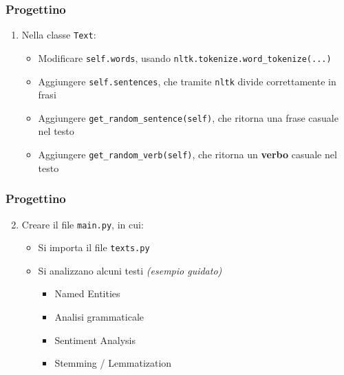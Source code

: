 \begin{exerciseframe}
    \frametitle{Progettino}

    \begin{enumerate}
        \item Nella classe \texttt{Text}:
        \begin{itemize}
            \item Modificare \texttt{self.words}, usando \texttt{nltk.tokenize.word\_tokenize(...)}
            \pause
            \item Aggiungere \texttt{self.sentences}, che tramite \texttt{nltk} divide correttamente in frasi
            \item Aggiungere \texttt{get\_random\_sentence(self)}, che ritorna una frase casuale nel testo
            \item Aggiungere \texttt{get\_random\_verb(self)}, che ritorna un \textbf{verbo} casuale nel testo
        \end{itemize}
    \end{enumerate}
\end{exerciseframe}

\begin{exerciseframe}
    \frametitle{Progettino}

    \begin{enumerate}
        \setcounter{enumi}{1}
        \item Creare il file \texttt{main.py}, in cui:
        \begin{itemize}
            \item Si importa il file \texttt{texts.py} 
            \item Si analizzano alcuni testi \textit{(esempio guidato)}
            \begin{itemize}
                \item Named Entities
                \item Analisi grammaticale
                \item Sentiment Analysis
                \item Stemming / Lemmatization
            \end{itemize}
        \end{itemize}
    \end{enumerate}
\end{exerciseframe}



